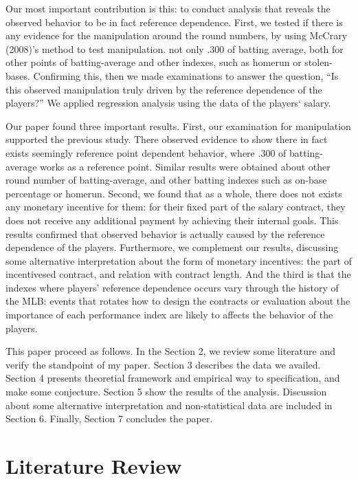 \documentclass[dvipdfmx, 12pt]{article}
\begin{document}
Our most important contribution is this: to conduct analysis that reveals the observed behavior to be in fact reference dependence. First, we tested if there is any evidence for the manipulation around the round numbers, by using McCrary (2008)'s method to test manipulation. not only .300 of batting average, both for other points of batting-average and other indexes, such as homerun or stolen-bases. Confirming this, then we made examinations to answer the question, ``Is this observed manipulation truly driven by the reference dependence of the players?'' We applied regression analysis using the data of the players` salary.

Our paper found three important results. First, our examination for manipulation supported the previous study. There observed evidence to show there in fact exists seemingly reference point dependent behavior, where .300 of batting-average works as a reference point. Similar results were obtained about other round number of batting-average, and other batting indexes such as on-base percentage or homerun. Second, we found that as a whole, there does not exists any monetary incentive for them: for their fixed part of the salary contract, they does not receive any additional payment by achieving their internal goals. This results confirmed that observed behavior is actually caused by the reference dependence of the players. Furthermore, we complement our results, discussing some alternative interpretation about the form of monetary incentives: the part of incentivesed contract, and relation with contract length. And the third is that the indexes where players' reference dependence occurs vary through the history of the MLB: events that rotates how to design the contracts or evaluation about the importance of each performance index are likely to affects the behavior of the players.

This paper proceed as follows. In the Section 2, we review some literature and verify the standpoint of my paper. Section 3 describes the data we availed. Section 4 presents theoretial framework and empirical way to specification, and make some conjecture.  Section 5 show the results of the analysis. Discussion about some alternative interpretation and non-statistical data are included in Section 6. Finally, Section 7 concludes the paper.

\section{Literature Review}
\end{document}

